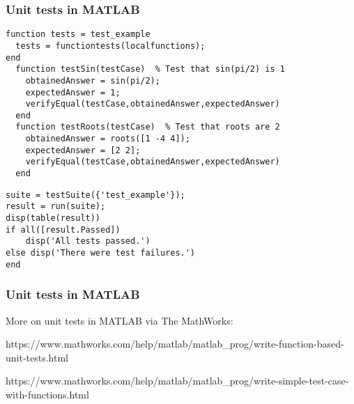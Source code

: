 \begin{frame}[fragile]
  \frametitle{Unit tests in MATLAB}
  \begin{lstlisting}[style=MATLAB]
function tests = test_example
  tests = functiontests(localfunctions);
end
  function testSin(testCase)  % Test that sin(pi/2) is 1
    obtainedAnswer = sin(pi/2);
    expectedAnswer = 1;
    verifyEqual(testCase,obtainedAnswer,expectedAnswer)
  end
  function testRoots(testCase)  % Test that roots are 2
    obtainedAnswer = roots([1 -4 4]);
    expectedAnswer = [2 2];
    verifyEqual(testCase,obtainedAnswer,expectedAnswer)
  end
\end{lstlisting}\pause

  \begin{lstlisting}[style=MATLAB]
suite = testSuite({'test_example'});
result = run(suite);
disp(table(result))
if all([result.Passed])
    disp('All tests passed.')
else disp('There were test failures.')
end
  \end{lstlisting}
\end{frame}

\begin{frame}[fragile]
  \frametitle{Unit tests in MATLAB}
  More on unit tests in MATLAB via The MathWorks:
  
  {https://www.mathworks.com/help/matlab/matlab\_prog/write-function-based-unit-tests.html}
  
  {https://www.mathworks.com/help/matlab/matlab\_prog/write-simple-test-case-with-functions.html}
\end{frame}
